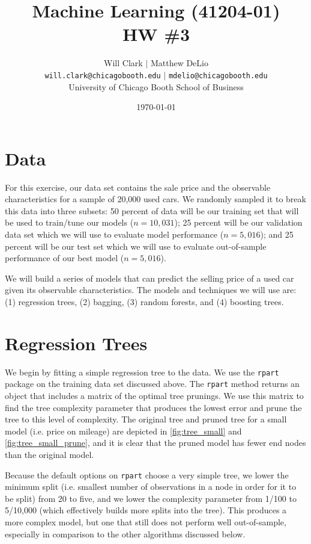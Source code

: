 \documentclass[11pt, fleqn]{article}
\begin{document}
\title{Machine Learning (41204-01)\\HW \#3}
\author{Will Clark $\vert$ Matthew DeLio \\
\texttt{will.clark@chicagobooth.edu} $\vert$ \texttt{mdelio@chicagobooth.edu} \\
University of Chicago Booth School of Business}
\date{\today}
\maketitle

\section{Data}

For this exercise, our data set contains the sale price and the observable characteristics for a sample of 20,000 used cars. We randomly sampled it to break this data into three subsets: 50 percent of data will be our training set that will be used to train/tune our models ($n=10,031$); 25 percent will be our validation data set which we will use to evaluate model performance ($n=5,016$); and 25 percent will be our test set which we will use to evaluate out-of-sample performance of our best model ($n=5,016$).

We will build a series of models that can predict the selling price of a used car given its observable characteristics. The models and techniques we will use are: (1) regression trees, (2) bagging, (3) random forests, and (4) boosting trees.

\section{Regression Trees}

We begin by fitting a simple regression tree to the data. We use the \texttt{rpart} package on the training data set discussed above. The \texttt{rpart} method returns an object that includes a matrix of the optimal tree prunings. We use this matrix to find the tree complexity parameter that produces the lowest error and prune the tree to this level of complexity. The original tree and pruned tree for a small model (i.e. price on mileage) are depicted in \cref{fig:tree_small} and \cref{fig:tree_small_prune}, and it is clear that the pruned model has fewer end nodes than the original model.

Because the default options on \texttt{rpart} choose a very simple tree, we lower the minimum split (i.e. smallest number of observations in a node in order for it to be split) from 20 to five, and we lower the complexity parameter from 1/100 to 5/10,000 (which effectively builds more splits into the tree). This produces a more complex model, but one that still does not perform well out-of-sample, especially in comparison to the other algorithms discussed below.
\end{document}
